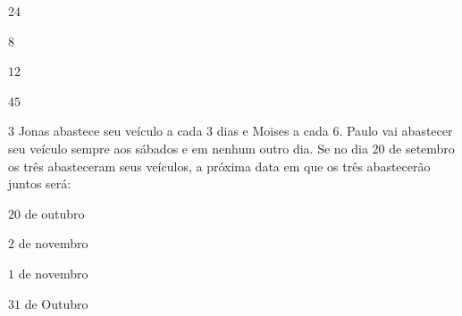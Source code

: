 \begin{escolha}
\item $24$ 
\item $8$ 
\item $12$ 
\item $45$
\end{escolha}



\num{3}  Jonas abastece seu veículo a cada $3$ dias e Moises a cada $6$. Paulo vai
abastecer seu veículo sempre aos sábados e em nenhum outro dia. Se no
dia $20$ de setembro os três abasteceram seus veículos, a próxima data em
que os três abastecerão juntos será:

\begin{escolha}
\item $20$ de outubro
\item $2$ de novembro
\item $1$ de novembro
\item $31$ de Outubro
\end{escolha}



